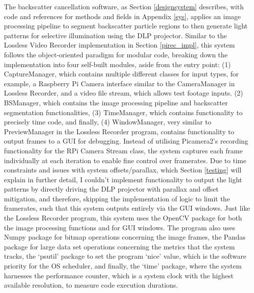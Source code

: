 The backscatter cancellation software, as Section \ref{designsystem} describes, with code and references for methods and fields in Appendix \ref{sys}, applies an image processing pipeline to segment backscatter particle regions to then generate light patterns for selective illumination using the DLP projector. Similar to the Lossless Video Recorder implementation in Section \ref{pirec_impl}, this system follows the object-oriented paradigm for modular code, breaking down the implementation into four self-built modules, aside from the entry point: (1) CaptureManager, which contains multiple different classes for input types, for example, a Raspberry Pi Camera interface similar to the CameraManager in Lossless Recorder, and a video file stream, which allows test footage inputs. (2) BSManager, which contains the image processing pipeline and backscatter segmentation functionalities, (3) TimeManager, which contains functionality to precisely time code, and finally, (4) WindowManager, very similar to PreviewManager in the Lossless Recorder program, contains functionality to output frames to a GUI for debugging. Instead of utilising Picamera2's recording functionality for the RPi Camera Stream class, the system captures each frame individually at each iteration to enable fine control over framerates.  Due to time constraints and issues with system offsets/parallax, which Section \ref{testing} will explain in further detail, I couldn't implement functionality to output the light patterns by directly driving the DLP projector with parallax and offset mitigation, and therefore, skipping the implementation of logic to limit the framerates, such that this system outputs entirely via the GUI windows. Just like the Lossless Recorder program, this system uses the OpenCV package for both the image processing functions and for GUI windows. The program also uses Numpy package for bitmap operations concerning the image frames, the Pandas package for large data set operations concerning the metrics that the system tracks, the `psutil' package to set the program `nice' value, which is the software priority for the OS scheduler, and finally, the `time' package, where the system harnesses the performance counter, which is a system clock with the highest available resolution, to measure code execution durations.


